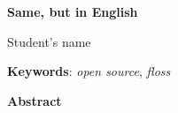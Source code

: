 \begin{otherlanguage}{english}


\begin{center}
	{\large\bfseries Same, but in English}
\end{center}
\begin{center}
	Student's name
\end{center}
\vspace{0.5cm}
\noindent\textbf{Keywords}: \textit{open source}, \textit{floss}
\vspace{0.7cm}

\noindent\textbf{Abstract}

\end{otherlanguage}